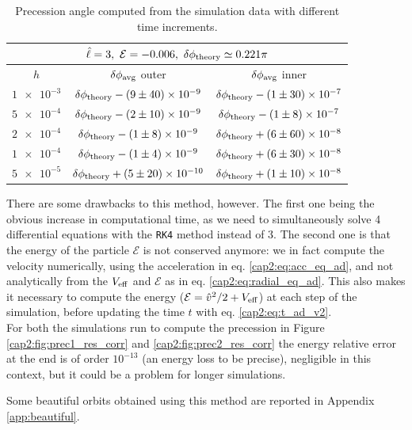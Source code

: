 \begin{table}[h!]
    \centering
    \begin{tabular}{|c|c|c|}
        \hline
        \multicolumn{3}{|c|}{$\hat \ell = 3, ~ \mathcal E = -0.006,
        ~ \delta \phi_{\rm theory} \simeq 0.221 \pi$} \\
        \hline
        $h$ & $\delta \phi_{\rm avg}$ outer & $\delta \phi_{\rm avg}$ inner \\
        \hline
        $\num{1e-3}$ & $\delta \phi_{\rm theory} - (9 \pm 40) \times \num{e-9}$
        & $\delta \phi_{\rm theory} - (1 \pm 30) \times \num{e-7}$ \\
        \hline
        $\num{5e-4}$ & $\delta \phi_{\rm theory} - (2 \pm 10) \times \num{e-9}$
        & $\delta \phi_{\rm theory} - (1 \pm 8) \times \num{e-7}$ \\
        \hline
        $\num{2e-4}$ & $\delta \phi_{\rm theory} - (1 \pm 8) \times \num{e-9}$
        & $\delta \phi_{\rm theory} + (6 \pm 60) \times \num{e-8}$ \\
        \hline
        $\num{1e-4}$ & $\delta \phi_{\rm theory} - (1 \pm 4) \times \num{e-9}$
        & $\delta \phi_{\rm theory} + (6 \pm 30) \times \num{e-8}$ \\
        \hline
        $\num{5e-5}$ & $\delta \phi_{\rm theory} + (5 \pm 20) \times \num{e-10}$
        & $\delta \phi_{\rm theory} + (1 \pm 10) \times \num{e-8}$ \\
        \hline
    \end{tabular}
    \caption{Precession angle computed from the simulation data with different
    time increments.}
    \label{cap2:tab:prec2_corr}
\end{table}

There are some drawbacks to this method, however.
The first one being the obvious increase in computational time, as we need
to simultaneously solve 4 differential equations with the \texttt{RK4} method
instead of 3.
The second one is that the energy of the particle $\mathcal E$ is not conserved
anymore: we in fact compute the velocity numerically, using the acceleration
in eq. \ref{cap2:eq:acc_eq_ad}, and not analytically from the $V_{\rm eff}$ and
$\mathcal E$ as in eq. \ref{cap2:eq:radial_eq_ad}.
This also makes it necessary to compute the energy ($\mathcal E = \hat v^2 / 2 +
V_{\rm eff}$) at each step of the simulation, before updating the \Sh time $t$
with eq. \ref{cap2:eq:t_ad_v2}. \\
For both the simulations run to compute the precession in Figure
\ref{cap2:fig:prec1_res_corr} and \ref{cap2:fig:prec2_res_corr} the energy 
relative error at the end is of order $10^{-13}$ (an energy loss to be precise),
negligible in this context, but it could be a problem for longer
simulations.

Some beautiful orbits obtained using this method are reported in Appendix
\ref{app:beautiful}.



